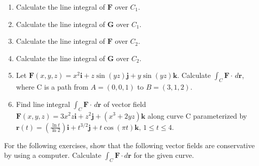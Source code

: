 \documentclass{exercises}
\begin{document}
\begin{enumerate}[resume]
\item Calculate the line integral of $\mathbf{F}$ over $C_{1}$.
\item Calculate the line integral of $\mathbf{G}$ over $C_{1}$.
\item Calculate the line integral of $\mathbf{F}$ over $C_{2}$.
\item Calculate the line integral of $\mathbf{G}$ over $C_{2}$.
\item \techrequired Let $\mathbf{F}(x,y,z)=x^{2}\mathbf{i}+z\sin(yz)\mathbf{j}+y\sin(yz)\mathbf{k}$. Calculate $\int_{C}\mathbf{F}\cdot \,d\mathbf{r}$, where C is a path from $A=(0,0,1)$ to $B=(3,1,2)$.
\item \techrequired Find line integral $\int_{C}\mathbf{F}\cdot \,d\mathbf{r}$ of vector field $\mathbf{F}(x,y,z)=3x^{2}z\mathbf{i}+z^{2}\mathbf{j}+(x^{3}+2yz)\mathbf{k}$ along curve C parameterized by $\mathbf{r}(t)=(\frac{\ln t}{\ln 2})\mathbf{i}+t^{3/2}\mathbf{j}+t\cos(\pi t)\mathbf{k},\,1\le t\le4$.
\end{enumerate}

For the following exercises, show that the following vector fields are conservative by using a computer. Calculate $\int_{C}\mathbf{F}\cdot d\mathbf{r}$ for the given curve.
\end{document}
